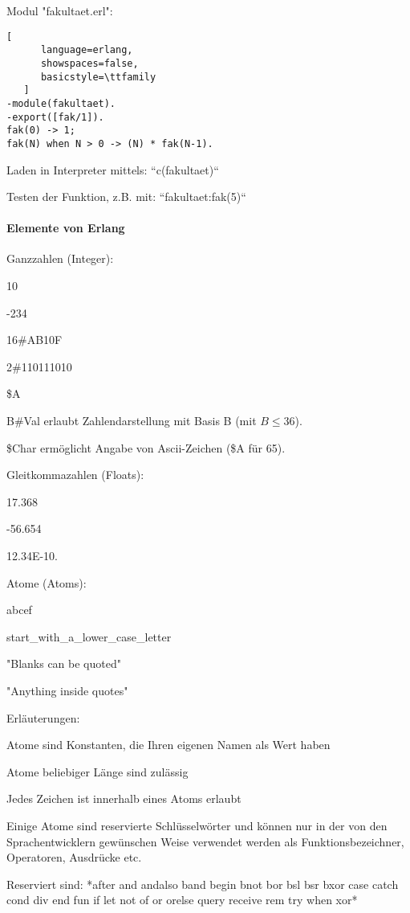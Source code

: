 \documentclass[10pt]{article}
\begin{document}
Modul "fakultaet.erl":
\begin{lstlisting}[
      language=erlang,
      showspaces=false,
      basicstyle=\ttfamily
   ]
-module(fakultaet).
-export([fak/1]).
fak(0) -> 1;
fak(N) when N > 0 -> (N) * fak(N-1).
\end{lstlisting}

Laden in Interpreter mittels: ``c(fakultaet)``

Testen der Funktion, z.B. mit: ``fakultaet:fak(5)``

\paragraph{Elemente von Erlang}
Ganzzahlen (Integer):
\begin{itemize*}
  \item 10
  \item -234
  \item 16\#AB10F
  \item 2\#110111010
  \item \$A
  \item B\#Val erlaubt Zahlendarstellung mit Basis B (mit $B\leq 36$).
  \item \$Char ermöglicht Angabe von Ascii-Zeichen (\$A für 65).
\end{itemize*}

Gleitkommazahlen (Floats):
\begin{itemize*}
  \item 17.368
  \item -56.654
  \item 12.34E-10.
\end{itemize*}

Atome (Atoms):
\begin{itemize*}
  \item abcef
  \item start\_with\_a\_lower\_case\_letter
  \item "Blanks can be quoted"
  \item "Anything inside quotes"
  \item Erläuterungen:
  \begin{itemize*}
    \item Atome sind Konstanten, die Ihren eigenen Namen als Wert haben
    \item Atome beliebiger Länge sind zulässig
    \item Jedes Zeichen ist innerhalb eines Atoms erlaubt
    \item Einige Atome sind reservierte Schlüsselwörter und können nur in der von den Sprachentwicklern gewünschen Weise verwendet werden als Funktionsbezeichner, Operatoren, Ausdrücke etc.
    \item Reserviert sind: *after and andalso band begin bnot bor bsl bsr bxor case catch cond div end fun if let not of or orelse query receive rem try when xor*
  \end{itemize*}
\end{itemize*}
\end{document}
